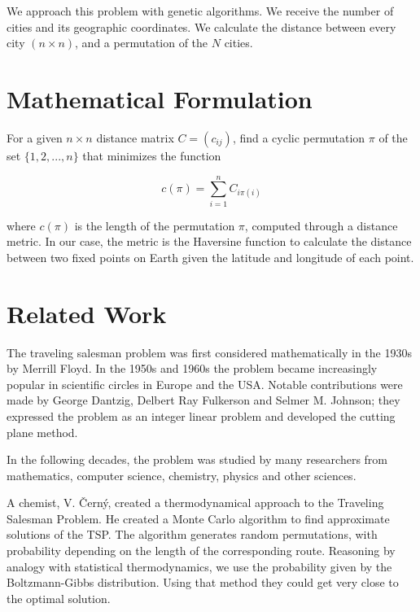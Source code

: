 \documentclass[twoside,twocolumn]{article}
\begin{document}
  We approach this problem with genetic algorithms. We receive the number of cities and its geographic coordinates. We calculate the distance between every city $(n \times n)$, and a permutation of the $N$ cities.\linebreak
  
  
  \section{Mathematical Formulation}
  
  For a given $n \times n$ distance matrix $C = (c_{ij})$, find a cyclic permutation $\pi$ of the set $\{1, 2, ..., n\}$ that minimizes the function
  
  \begin{equation}
  c(\pi) = \sum_{i=1}^{n} C_{i\pi(i)}
  \end{equation}
  
  where $c(\pi)$ is the length of the permutation $\pi$, computed through a distance metric. In our case, the metric is the Haversine function to calculate the distance between two fixed points on Earth given the latitude and longitude of each point.
  
  \section{Related Work}
  
  The traveling salesman problem was first considered mathematically in the 1930s by Merrill Floyd. In the 1950s and 1960s the problem became increasingly popular in scientific circles in Europe and the USA. Notable contributions were made by George Dantzig, Delbert Ray Fulkerson and Selmer M. Johnson; they expressed the problem as an integer linear problem and developed the cutting plane method.\linebreak
  
  In the following decades, the problem was studied by many researchers from mathematics, computer science, chemistry, physics and other sciences.\linebreak
  
  A chemist, V. Černý, created a thermodynamical approach to the Traveling Salesman Problem. He created a Monte Carlo algorithm to find approximate solutions of the TSP. The algorithm generates random permutations, with probability depending on the length of the corresponding route. Reasoning by analogy with statistical thermodynamics, we use the probability given by the Boltzmann-Gibbs distribution. Using that method they could get very close to the optimal solution.\linebreak
  
\end{document}
